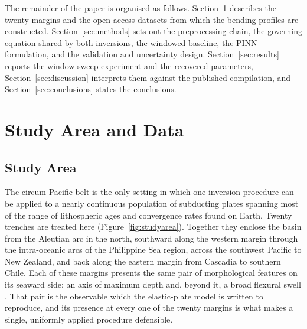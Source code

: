 \documentclass[final]{agujournal2019}
\begin{document}
The remainder of the paper is organised as follows. Section~\ref{sec:data}
describes the twenty margins and the open-access datasets from which the bending
profiles are constructed. Section~\ref{sec:methods} sets out the preprocessing
chain, the governing equation shared by both inversions, the windowed baseline,
the PINN formulation, and the validation and uncertainty design.
Section~\ref{sec:results} reports the window-sweep experiment and the recovered
parameters, Section~\ref{sec:discussion} interprets them against the published
compilation, and Section~\ref{sec:conclusions} states the conclusions.

\section{Study Area and Data}\label{sec:data}

\subsection{Study Area}\label{sec:studyarea}

The circum-Pacific belt is the only setting in which one inversion procedure can
be applied to a nearly continuous population of subducting plates spanning most
of the range of lithospheric ages and convergence rates found on Earth. Twenty
trenches are treated here (Figure~\ref{fig:studyarea}). Together they enclose
the basin from the Aleutian arc in the north, southward along the western margin
through the intra-oceanic arcs of the Philippine Sea region, across the
southwest Pacific to New Zealand, and back along the eastern margin from
Cascadia to southern Chile. Each of these margins presents the same pair of
morphological features on its seaward side: an axis of maximum depth and, beyond
it, a broad flexural swell \cite{Stern2002}. That pair is the observable which
the elastic-plate model is written to reproduce, and its presence at every one
of the twenty margins is what makes a single, uniformly applied procedure
defensible.
\end{document}
